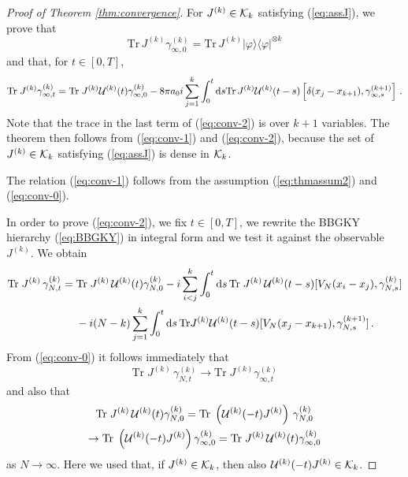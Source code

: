 \documentclass[11pt]{article}
\newcommand{\rd}{{\rm d}}
\newcommand{\ph}{\varphi}
\newcommand{\cU}{{\cal U}}
\newcommand{\tr}{\mbox{Tr}}
\newcommand{\cK}{{\cal K}}
\begin{document}
\begin{proof}[Proof of Theorem \ref{thm:convergence}]
\medskip

For $J^{(k)} \in \cK_k$ satisfying (\ref{eq:assJ}), we prove that
\begin{equation}\label{eq:conv-1}
\tr \, J^{(k)}  \gamma_{\infty,0}^{(k)} = \tr \, J^{(k)} |\ph
\rangle \langle \ph|^{\otimes k}
\end{equation}
and that, for $t \in [0,T]$,
\begin{equation}\label{eq:conv-2}
\begin{split}
\tr \; J^{(k)}  \gamma_{\infty,t}^{(k)} = \tr \; J^{(k)} \cU^{(k)}
(t)  \gamma_{\infty,0}^{(k)} -8\pi a_0 i \sum_{j=1}^k \int_0^t \rd s
\tr \, J^{(k)} \cU^{(k)} (t-s) \left[ \delta (x_j -x_{k+1}),
\gamma^{(k+1)}_{\infty,s} \right]\, .
\end{split}
\end{equation}
Note that the trace in the last term of (\ref{eq:conv-2}) is over
$k+1$ variables. The theorem then follows from (\ref{eq:conv-1}) and
(\ref{eq:conv-2}), because the set of $J^{(k)} \in \cK_k$ satisfying
(\ref{eq:assJ}) is dense in $\cK_k$.

The relation (\ref{eq:conv-1}) follows from the assumption
(\ref{eq:thmassum2}) and (\ref{eq:conv-0}).

In order to prove (\ref{eq:conv-2}), we fix $t \in [0,T]$, we
rewrite the BBGKY hierarchy (\ref{eq:BBGKY}) in integral form and we
test it against the observable $J^{(k)}$. We obtain
\begin{equation}\label{eq:conv-4}
\begin{split}
\tr \; J^{(k)} \, \gamma_{N,t}^{(k)} = \; & \tr \; J^{(k)} \,
\cU^{(k)} (t) \gamma_{N,0}^{(k)} - i \sum_{i<j}^k \int_0^t  \rd s \,
\tr \; J^{(k)} \, \cU^{(k)}
(t-s) [ V_N (x_i -x_j), \gamma_{N,s}^{(k)} ] \\
& -i (N-k) \sum_{j=1}^k \int_0^t \rd s \, \tr J^{(k)} \cU^{(k)}
(t-s) [ V_N (x_j -x_{k+1}) , \gamma_{N,s}^{(k+1)} ] \,.
\end{split}
\end{equation}
{F}rom (\ref{eq:conv-0}) it follows immediately that
\begin{equation}\label{eq:conv-4-1}
\tr \; J^{(k)} \, \gamma_{N,t}^{(k)} \to \tr \; J^{(k)}
\gamma_{\infty,t}^{(k)}
\end{equation}
and also that
\begin{multline}\label{eq:conv-4-2}
\tr \; J^{(k)} \,\cU^{(k)} (t)  \gamma_{N,0}^{(k)} =  \tr \;
\left(\cU^{(k)} (-t) J^{(k)}\right) \,  \gamma_{N,0}^{(k)} \\ \to
\tr\;\left(\cU^{(k)} (-t) J^{(k)}\right)  \gamma_{\infty,0}^{(k)}
=\tr \; J^{(k)} \,\cU^{(k)} (t)  \gamma_{\infty,0}^{(k)}
\end{multline}
as $N \to \infty$. Here we used that, if $J^{(k)} \in \cK_k$, then
also $\cU^{(k)} (-t) J^{(k)} \in \cK_k$.


\end{proof}
\end{document}
